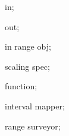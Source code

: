 {

  \attribute in;

  \attribute out;

  \attribute in range obj;
  
  \attribute scaling spec;

  \attribute function;
  
  \attribute interval mapper;
  
  \attribute range surveyor;
  
}
